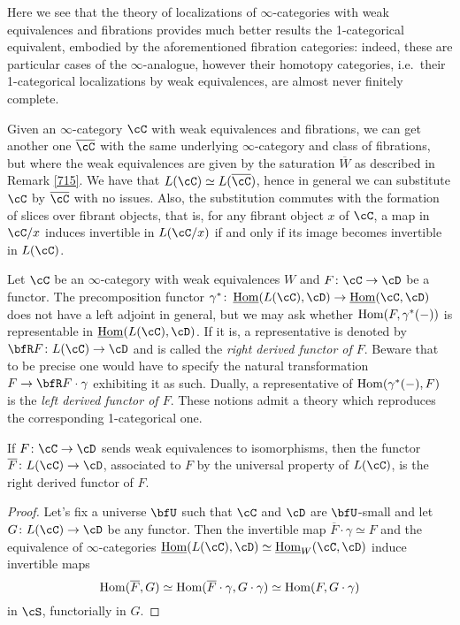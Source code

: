\begin{rmk}
  Here we see that the theory of localizations of $\infty$-categories with weak
  equivalences and fibrations provides much better results the 1-categorical
  equivalent, embodied by the aforementioned fibration categories: indeed, these
  are particular cases of the $\infty$-analogue, however their homotopy
  categories, i.e.\ their 1-categorical localizations by weak equivalences, are
  almost never finitely complete.
\end{rmk}

\begin{construction}\label{7522}
  
  Given an $\infty$-category $\cC$ with weak equivalences and fibrations, we can
  get another one $\overline{\cC}$ with the same underlying $\infty$-category
  and class of fibrations, but where the weak equivalences are given by the
  saturation $\overline{W}$ as described in Remark \ref{715}. We have that
  $L(\cC)\simeq L(\overline{\cC})$, hence in general we can substitute $\cC$ by
  $\overline{\cC}$ with no issues. Also, the substitution commutes with the
  formation of slices over fibrant objects, that is, for any fibrant object $x$
  of $\cC$, a map in $\cC/x$ induces invertible in $L(\cC/x)$ if and only
  if its image becomes invertible in $L(\cC)$.
\end{construction}

\begin{rmk}
  Let $\cC$ be an $\infty$-category with weak equivalences $W$ and
  $F\colon\cC\rightarrow\cD$ be a functor. The precomposition functor
  $\gamma^*\colon\home(L(\cC),\cD)\rightarrow\home(\cC,\cD)$ does not have a
  left adjoint in general, but we may ask whether $\operatorname{Hom}(F,\gamma^*(-))$ is
  representable in $\home(L(\cC),\cD)$. If it is, a representative is denoted by
  $\bfR F\colon L(\cC)\rightarrow\cD$ and is called the \emph{right derived
  functor of $F$}. Beware that to be precise one would have to specify the
  natural transformation $F\rightarrow\bfR F\cdot\gamma$ exhibiting it as such.
  Dually, a representative of $\operatorname{Hom}(\gamma^*(-),F)$ is the \emph{left derived
  functor of $F$}. These notions admit a theory which reproduces the
  corresponding 1-categorical one.
\end{rmk}

\begin{prop}\label{7524}

  If $F\colon\cC\rightarrow\cD$ sends weak equivalences to isomorphisms, then
  the functor $\overline{F}\colon L(\cC)\rightarrow\cD$, associated to $F$ by
  the universal property of $L(\cC)$, is the right derived functor of $F$.
\end{prop}
\begin{proof}
  Let's fix a universe $\bfU$ such that $\cC$ and $\cD$ are $\bfU$-small and let
  $G\colon L(\cC)\rightarrow\cD$ be any functor. Then the invertible map
  $\overline{F}\cdot\gamma\simeq F$ and the equivalence of $\infty$-categories
  $\home(L(\cC),\cD)\simeq\home_W(\cC,\cD)$ induce invertible maps
  \[\operatorname{Hom}(\overline{F},G)\simeq\operatorname{Hom}(\overline{F}\cdot\gamma,G\cdot\gamma)\simeq\operatorname{Hom}(F,G\cdot\gamma)\]
  in $\cS$, functorially in $G$.
\end{proof}

